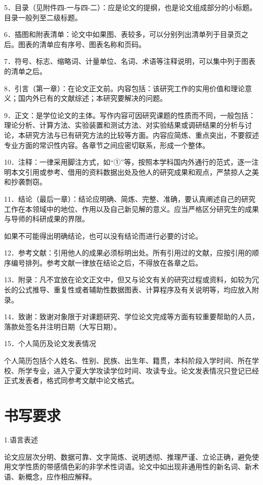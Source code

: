5．目录（见附件四-一与四-二）：应是论文的提纲，也是论文组成部分的小标题。目录一般列至二级标题。

6．插图和附表清单：论文中如果图、表较多，可以分别列出清单列于目录页之后。图表的清单应有序号、图表名称和页码。

7．符号、标志、缩略词、计量单位、名词、术语等注释说明，可以集中列于图表的清单之后。

8．引言（第一章）：在论文正文前。内容包括：该研究工作的实用价值和理论意义；国内外已有的文献综述；本研究要解决的问题。

9．正文：是学位论文的主体。写作内容可因研究课题的性质而不同，一般包括：理论分析、计算方法、实验装置和测试方法、对实验结果或调研结果的分析与讨论，本研究方法与已有研究方法的比较等方面。内容应简炼、重点突出，不要叙述专业方面的常识性内容。各章节之间应密切联系，形成一个整体。

10．注释：一律采用脚注方式，如“①”等，按照本学科国内外通行的范式，逐一注明本文引用或参考、借用的资料数据出处及他人的研究成果和观点，严禁掠人之美和抄袭剽窃。

11．结论（最后一章）：结论应明确、简炼、完整、准确，要认真阐述自己的研究工作在本领域中的地位、作用以及自己新见解的意义。应当严格区分研究生的成果与导师的科研成果的界限。

如果不可能得出明确结论，也可以没有结论而进行必要的讨论。

12．参考文献：引用他人的成果必须标明出处。所有引用过的文献，应按引用的顺序编号排列。参考文献一律放在结论之后，不得放在各章之后。

13．附录：凡不宜放在论文正文中，但又与论文有关的研究过程或资料，如较为冗长的公式推导、重复性或者辅助性数据图表、计算程序及有关说明等，均应放入附录。

14．致谢：致谢对象限于对课题研究、学位论文完成等方面有较重要帮助的人员，落款处签名并注明日期（大写日期）。

15．个人简历及论文发表情况

个人简历包括个人姓名、性别、民族、出生年、籍贯，本科阶段入学时间、所在学校、所学专业，进入宁夏大学攻读学位时间、攻读专业。论文发表情况只登记已经正式发表者，格式同参考文献中论文格式。

\section{书写要求}

1.语言表述

论文应层次分明、数据可靠、文字简炼、说明透彻、推理严谨、立论正确，避免使用文学性质的带感情色彩的非学术性词语。论文中如出现非通用性的新名词、新术语、新概念，应作相应解释。

